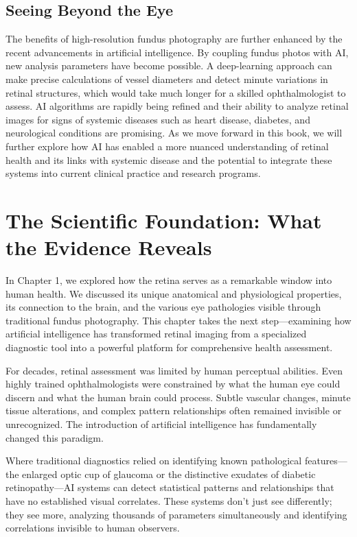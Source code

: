 \documentclass[
  Letterpaper,
]{scrbook}
\begin{document}
\section{Seeing Beyond the Eye}\label{seeing-beyond-the-eye}

The benefits of high-resolution fundus photography are further enhanced
by the recent advancements in artificial intelligence. By coupling
fundus photos with AI, new analysis parameters have become possible. A
deep-learning approach can make precise calculations of vessel diameters
and detect minute variations in retinal structures, which would take
much longer for a skilled ophthalmologist to assess. AI algorithms are
rapidly being refined and their ability to analyze retinal images for
signs of systemic diseases such as heart disease, diabetes, and
neurological conditions are promising. As we move forward in this book,
we will further explore how AI has enabled a more nuanced understanding
of retinal health and its links with systemic disease and the potential
to integrate these systems into current clinical practice and research
programs.


\chapter{The Scientific Foundation: What the Evidence
Reveals}\label{the-scientific-foundation-what-the-evidence-reveals}

In Chapter 1, we explored how the retina serves as a remarkable window
into human health. We discussed its unique anatomical and physiological
properties, its connection to the brain, and the various eye pathologies
visible through traditional fundus photography. This chapter takes the
next step---examining how artificial intelligence has transformed
retinal imaging from a specialized diagnostic tool into a powerful
platform for comprehensive health assessment.

For decades, retinal assessment was limited by human perceptual
abilities. Even highly trained ophthalmologists were constrained by what
the human eye could discern and what the human brain could process.
Subtle vascular changes, minute tissue alterations, and complex pattern
relationships often remained invisible or unrecognized. The introduction
of artificial intelligence has fundamentally changed this paradigm.

Where traditional diagnostics relied on identifying known pathological
features---the enlarged optic cup of glaucoma or the distinctive
exudates of diabetic retinopathy---AI systems can detect statistical
patterns and relationships that have no established visual correlates.
These systems don't just see differently; they see more, analyzing
thousands of parameters simultaneously and identifying correlations
invisible to human observers.
\end{document}
